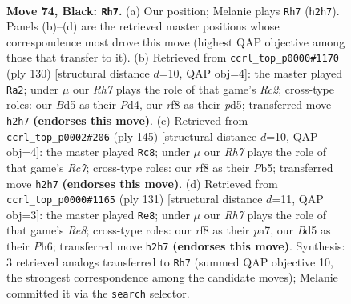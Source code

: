 \documentclass[11pt]{article}
\begin{document}
\clearpage

\begin{figure}[p]\centering
\begin{subfigure}{0.46\textwidth}\centering
\resizebox{\linewidth}{!}{%
\newchessgame
\chessboard[
  setfen={5R2/8/3k4/3b4/1P6/8/7r/3KR3 b - - 22 74},
  showmover=false,
  pgfstyle=straightmove, color=movearrow, markmove={h2-h7}
]}
\caption{}
\end{subfigure}\hfill
\begin{subfigure}{0.46\textwidth}\centering
\resizebox{\linewidth}{!}{%
\newchessgame
\chessboard[
  setfen={8/3kr3/6K1/3p4/3P4/8/2R5/8 w - - 14 66},
  showmover=false,
  pgfstyle=straightmove, color=movearrow, markmove={c2-a2}
]}
\caption{}
\end{subfigure}
\\[4pt]
\begin{subfigure}{0.46\textwidth}\centering
\resizebox{\linewidth}{!}{%
\newchessgame
\chessboard[
  setfen={8/8/4k1P1/1p6/8/8/2r5/5RK1 b - - 1 73},
  showmover=false,
  pgfstyle=straightmove, color=movearrow, markmove={c2-c8}
]}
\caption{}
\end{subfigure}\hfill
\begin{subfigure}{0.46\textwidth}\centering
\resizebox{\linewidth}{!}{%
\newchessgame
\chessboard[
  setfen={8/P7/7p/1K3k2/1R6/8/8/4r3 b - - 0 66},
  showmover=false,
  pgfstyle=straightmove, color=movearrow, markmove={e1-e8}
]}
\caption{}
\end{subfigure}
\caption{\textbf{Move 74, Black: \texttt{Rh7}.} (a) Our position; Melanie plays \texttt{Rh7} (\texttt{h2h7}). Panels (b)--(d) are the retrieved master positions whose correspondence most drove this move (highest QAP objective among those that transfer to it). (b) Retrieved from \texttt{ccrl\_top\_p0000\#1170} (ply 130) [structural distance $d$=10, QAP obj=4]: the master played \texttt{Ra2}; under $\mu$ our \emph{Rh7} plays the role of that game's \emph{Rc2}; cross-type roles: our \emph{B}d5 as their \emph{P}d4, our \emph{r}f8 as their \emph{p}d5; transferred move \texttt{h2h7} \textbf{(endorses this move)}. (c) Retrieved from \texttt{ccrl\_top\_p0002\#206} (ply 145) [structural distance $d$=10, QAP obj=4]: the master played \texttt{Rc8}; under $\mu$ our \emph{Rh7} plays the role of that game's \emph{Rc7}; cross-type roles: our \emph{r}f8 as their \emph{P}b5; transferred move \texttt{h2h7} \textbf{(endorses this move)}. (d) Retrieved from \texttt{ccrl\_top\_p0000\#1165} (ply 131) [structural distance $d$=11, QAP obj=3]: the master played \texttt{Re8}; under $\mu$ our \emph{Rh7} plays the role of that game's \emph{Re8}; cross-type roles: our \emph{r}f8 as their \emph{p}a7, our \emph{B}d5 as their \emph{P}h6; transferred move \texttt{h2h7} \textbf{(endorses this move)}. Synthesis: 3 retrieved analogs transferred to \texttt{Rh7} (summed QAP objective 10, the strongest correspondence among the candidate moves); Melanie committed it via the \texttt{search} selector.}
\label{fig:thought-m147}
\end{figure}
\end{document}
